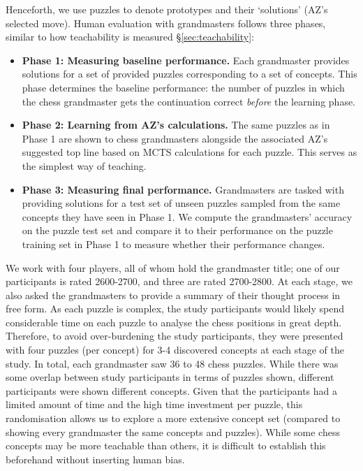 \documentclass{article}
\begin{document}
Henceforth, we use puzzles to denote prototypes and their `solutions' (AZ's selected move). 
Human evaluation with grandmasters follows three phases, similar to how teachability is measured \S\ref{sec:teachability}:
\begin{itemize}
    \item \textbf{Phase 1: Measuring baseline performance.} Each grandmaster provides solutions for a set of provided puzzles corresponding to a set of concepts. 
    This phase determines the baseline performance: the number of puzzles in which the chess grandmaster gets the continuation correct \textit{before} the learning phase.
    \item \textbf{Phase 2: Learning from AZ's calculations.} The same puzzles as in Phase 1 are shown to chess grandmasters alongside the associated AZ's suggested top line based on MCTS calculations for each puzzle. This serves as the simplest way of teaching. 
    \item \textbf{Phase 3: Measuring final performance.} Grandmasters are tasked with providing solutions for a test set of unseen puzzles sampled from the same concepts they have seen in Phase 1.
    We compute the grandmasters' accuracy on the puzzle test set and compare it to their performance on the puzzle training set in Phase 1 to measure whether their performance changes.
\end{itemize}
We work with four players, all of whom hold the grandmaster title; one of our participants is rated 2600-2700, and three are rated 2700-2800. 
At each stage, we also asked the grandmasters to provide a summary of their thought process in free form.
As each puzzle is complex, the study participants would likely spend considerable time on each puzzle to analyse the chess positions in great depth.
Therefore, to avoid over-burdening the study participants, they were presented with four puzzles (per concept) for 3-4 discovered concepts at each stage of the study. In total, each grandmaster saw 36 to 48 chess puzzles. While there was some overlap between study participants in terms of puzzles shown, different participants were shown different concepts. Given that the participants had a limited amount of time and the high time investment per puzzle, this randomisation allows us to explore a more extensive concept set (compared to showing every grandmaster the same concepts and puzzles). 
While some chess concepts may be more teachable than others, it is difficult to establish this beforehand without inserting human bias. 
\end{document}
